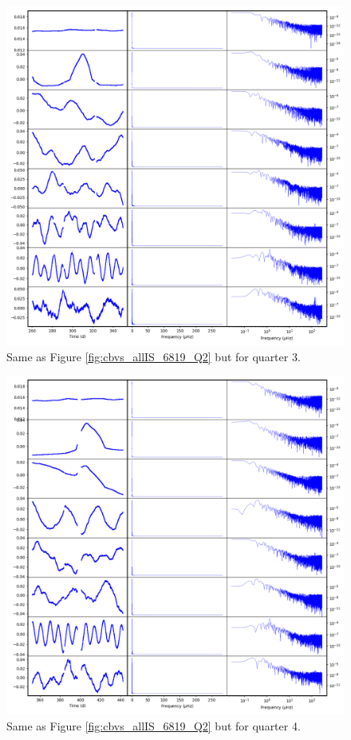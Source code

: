 \begin{figure}
    \centering
    \includegraphics[width=\linewidth]{Chapter_Appended/AppB/cbv_6819_q03.png}
    \caption{Same as Figure \ref{fig:cbvs_allIS_6819_Q2} but for quarter 3.}
    \label{fig:cbvs_allIS_6819_Q03}
\end{figure}


\begin{figure}
    \centering
    \includegraphics[width=\linewidth]{Chapter_Appended/AppB/cbv_6819_q04.png}
    \caption{Same as Figure \ref{fig:cbvs_allIS_6819_Q2} but for quarter 4.}
    \label{fig:cbvs_allIS_6819_Q04}
\end{figure}


